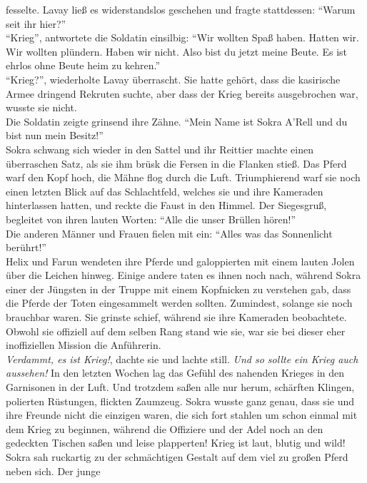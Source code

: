 fesselte. Lavay ließ es widerstandslos geschehen und fragte stattdessen: ``Warum seit ihr hier?''\\
``Krieg'', antwortete die Soldatin einsilbig: ``Wir wollten Spaß haben. Hatten wir. Wir wollten 
plündern. Haben wir nicht. Also bist du jetzt meine Beute. Es ist ehrlos ohne Beute heim zu 
kehren.''\\
``Krieg?'', wiederholte Lavay überrascht. Sie hatte gehört, dass die kasirische Armee dringend 
Rekruten suchte, aber dass der Krieg bereits ausgebrochen war, wusste sie nicht.\\
Die Soldatin zeigte grinsend ihre Zähne. ``Mein Name ist Sokra A'Rell und du bist nun mein 
Besitz!''\\

Sokra schwang sich wieder in den Sattel und ihr Reittier machte einen überraschen Satz, als sie ihm 
brüsk die Fersen in die Flanken stieß. Das Pferd warf den Kopf hoch, die Mähne flog durch die Luft. 
Triumphierend warf sie noch einen letzten Blick auf das Schlachtfeld, welches sie und ihre 
Kameraden hinterlassen hatten, und reckte die Faust in den Himmel. Der Siegesgruß, begleitet von 
ihren lauten Worten: ``Alle die unser Brüllen hören!''\\
Die anderen Männer und Frauen fielen mit ein: ``Alles was das Sonnenlicht berührt!''\\
Helix und Farun wendeten ihre Pferde und galoppierten mit einem lauten Jolen über die Leichen 
hinweg. Einige andere taten es ihnen noch nach, während Sokra einer der Jüngsten in der Truppe mit 
einem Kopfnicken zu verstehen gab, dass die Pferde der Toten eingesammelt werden sollten. 
Zumindest, solange sie noch brauchbar waren. Sie grinste schief, während sie ihre Kameraden 
beobachtete. Obwohl sie offiziell auf dem selben Rang stand wie sie, war sie bei dieser eher 
inoffiziellen Mission die Anführerin.\\
\textit{Verdammt, es ist Krieg!}, dachte sie und lachte still. \textit{Und so sollte ein Krieg auch 
aussehen!}
In den letzten Wochen lag das Gefühl des nahenden Krieges in den Garnisonen in der Luft. Und 
trotzdem saßen alle nur herum, schärften Klingen, polierten Rüstungen, flickten Zaumzeug. Sokra 
wusste ganz genau, dass sie und ihre Freunde nicht die einzigen waren, die sich fort stahlen um 
schon einmal mit dem Krieg zu beginnen, während die Offiziere und der Adel noch an den gedeckten 
Tischen saßen und leise plapperten! Krieg ist laut, blutig und wild!\\
Sokra sah ruckartig zu der schmächtigen Gestalt auf dem viel zu großen Pferd neben sich. Der junge 
